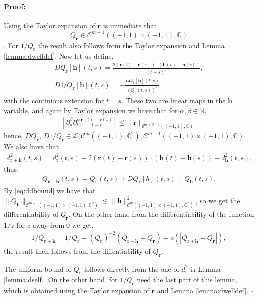\documentclass{article}
\newenvironment{proof}{\paragraph{Proof:}}{\hfill$\square$}
\newcommand{\IC}{{\mathbb C}}
\newcommand{\IN}{{\mathbb N}}
\newcommand{\cmspace}[3]{\mathcal{C}^{#1} \left( #2, #3 \right)}
\newcommand{\bh}{\bm{h}}
\newcommand{\br}{\bm{r}}
\newcommand{\iinterv}{(-1,1)\times(-1,1)}
\begin{document}
\begin{proof}
Using the Taylor expansion of $\br$  is immediate that  $$Q_{\br} \in \cmspace{m-1}{(-1,1)\times(-1,1)}{\IC}$$. For $1/Q_{\br}$ the result also follows from the Taylor expansion and Lemma \ref{lemma:dwelldef}.  Now let us define,
\begin{align*}
DQ_{\br}[\bh](t,s) = \frac{2 (\br(t)-\br(s))\cdot (\bh(t)-\bh(s))}{(t-s)^2}, \\
D1/Q_{\br}[\bh](t,s) = -\frac{DQ_{\br}[\bh](t,s)}{(Q_{\br}(t,s))^2} 
\end{align*}
with the continious extension for $t=s$. These two are linear maps in the $\bh$ variable, and again by Taylor expansion we have that for $\alpha, \beta \in \IN$, 
\begin{align}
\label{eq:ddbound}
\left\vert \left\vert \partial_s^\beta \partial_t^\alpha \frac{\br(t)-\br(s)}{t-s} \right \vert  \right \vert\leq \| \br \|_{\cmspace{\alpha+\beta+1}{(-1,1)}{\IC}}
\end{align}
hence, $DQ_{\br}$, $D1/Q_{\br} \in \mathcal{L}(\cmspace{m}{(-1,1)}{\IC^2}
  , \cmspace{m-1}{(-1,1)\times(-1,1)}{\IC}$.
We also have that 
\begin{align*}
d_{\br +\bh}^2(t,s) = d^2_{\br}(t,s) + 2 (\br(t) -\br(s))\cdot (\bh(t)-\bh(s)) + d_{\bh}^2(t,s),
\end{align*}
thus, 
\begin{align*}
Q_{\br +\bh}(t,s) = Q_{\br}(t,s) + DQ_{\br}[h](t,s) + Q_{\bh}(t,s).
\end{align*}
By \eqref{eq:ddbound} we have that $\| Q_{\bh}\|_{\cmspace{m-1}{\iinterv}{\IC^2}} \lesssim \| \bh\|_{\cmspace{m}{\iinterv}{\IC^2}}^2$, so we get the differentiability of $Q_{\br}$. On the other hand from the differentiability of the function $1/z$ for $z$ away from $0$ we get, 
\begin{align*}
1/Q_{\br+\bh} = 1/Q_{\br} - (Q_{\br})^{-2} (Q_{\br+\bh}-Q_{\br}) + o(|Q_{\br+\bh}-Q_{\br}|),
\end{align*}
the result then follows from the diffentiability of $Q_{\br}$.

The uniform bound of $Q_{\br}$ follows directly from the one of $d^2_{\br}$ in Lemma \ref{lemma:dself}. On the other hand, for $1/Q_{\br}$ need the last part of this lemma, which is obtained using the Taylor expansion of $\br$ and Lemma \ref{lemma:dwelldef}.
\end{proof}
\end{document}
